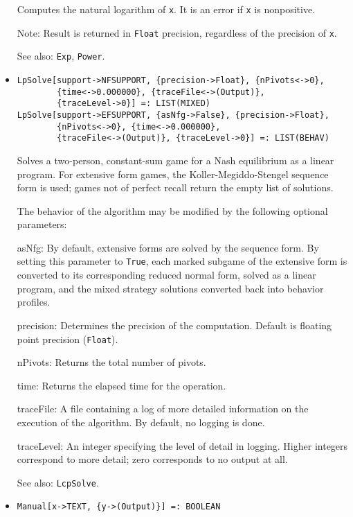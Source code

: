 \begin{itemize}
\bd
Computes the natural logarithm of \verb+x+.  It is an error if
\verb+x+ is nonpositive.
\item [Note:] Result is returned in \verb+Float+ precision, regardless of
the precision of \verb+x+.
\item [See also:] \verb+Exp+, \verb+Power+.
\ed

\item{}
\protect \large \begin{verbatim}
LpSolve[support->NFSUPPORT, {precision->Float}, {nPivots<->0}, 
        {time<->0.000000}, {traceFile<->(Output)}, 
        {traceLevel->0}] =: LIST(MIXED) 
LpSolve[support->EFSUPPORT, {asNfg->False}, {precision->Float}, 
        {nPivots<->0}, {time<->0.000000}, 
        {traceFile<->(Output)}, {traceLevel->0}] =: LIST(BEHAV) 
\end{verbatim}\normalsize

\bd
Solves a two-person, constant-sum game for a Nash equilibrium as a linear
program.  For extensive form games, the Koller-Megiddo-Stengel
sequence form is used; games not of perfect recall return the empty
list of solutions.

The behavior of the algorithm may be modified by the following optional
parameters:
\bd
\item
[asNfg:] By default, extensive forms are solved by the sequence form.
By setting this parameter to \verb+True+, each marked subgame of the
extensive form is converted to its corresponding reduced normal form,
solved as a linear program, and the mixed strategy solutions converted back
into behavior profiles.
\item
[precision:] Determines the precision of the computation. Default is
floating point precision (\verb+Float+). 
\item
[nPivots:] Returns the total number of pivots.
\item
[time:] Returns the elapsed time for the operation.
\item
[traceFile:] A file containing a log of more detailed information on the
execution of the algorithm.  By default, no logging is done.
\item
[traceLevel:] An integer specifying the level of detail in logging.
Higher integers correspond to more detail; zero corresponds to no
output at all.
\ed
\item [See also:] \verb+LcpSolve+.
\ed


\item{}
\protect \large \begin{verbatim}
Manual[x->TEXT, {y->(Output)}] =: BOOLEAN 
\end{verbatim} \normalsize


\end{itemize}
